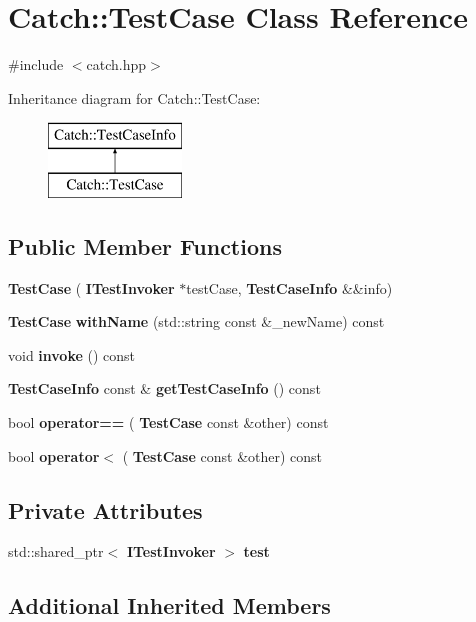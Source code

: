 \section{Catch\+::Test\+Case Class Reference}
\label{class_catch_1_1_test_case}


{\ttfamily \#include $<$catch.\+hpp$>$}

Inheritance diagram for Catch\+::Test\+Case\+:\begin{figure}[H]
\begin{center}
\leavevmode
\includegraphics[height=2.000000cm]{class_catch_1_1_test_case}
\end{center}
\end{figure}
\subsection*{Public Member Functions}
\begin{DoxyCompactItemize}
\item 
\textbf{ Test\+Case} (\textbf{ I\+Test\+Invoker} $\ast$test\+Case, \textbf{ Test\+Case\+Info} \&\&info)
\item 
\textbf{ Test\+Case} \textbf{ with\+Name} (std\+::string const \&\+\_\+new\+Name) const
\item 
void \textbf{ invoke} () const
\item 
\textbf{ Test\+Case\+Info} const  \& \textbf{ get\+Test\+Case\+Info} () const
\item 
bool \textbf{ operator==} (\textbf{ Test\+Case} const \&other) const
\item 
bool \textbf{ operator$<$} (\textbf{ Test\+Case} const \&other) const
\end{DoxyCompactItemize}
\subsection*{Private Attributes}
\begin{DoxyCompactItemize}
\item 
std\+::shared\+\_\+ptr$<$ \textbf{ I\+Test\+Invoker} $>$ \textbf{ test}
\end{DoxyCompactItemize}
\subsection*{Additional Inherited Members}


